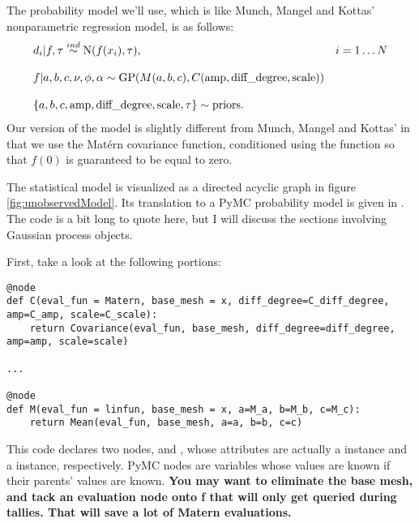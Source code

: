 \documentclass{manual}
\begin{document}
The probability model we'll use, which is like Munch, Mangel and Kottas' nonparametric regression model, is as follows:
\begin{equation}
	\label{eqn:npregression}
	\begin{array}{ll}
		d_i|f,\tau\stackrel{{\tiny ind}}{\sim} \textup N(f(x_i), \tau),&i=1\ldots N\\\\
		f|a,b,c,\nu,\phi,\alpha\sim\textup{GP}(M(a,b,c),C(\textup{amp} ,\textup{diff\_degree} ,\textup{scale}))&\\\\
		\{a,b,c,\textup{amp} ,\textup{diff\_degree} ,\textup{scale},\tau\} \sim \textup{priors}.
	\end{array}
\end{equation}
Our version of the model is slightly different from Munch, Mangel and Kottas' in that we use the Mat\'ern covariance function, conditioned using the  function so that $f(0)$ is guaranteed to be equal to zero.

The statistical model is visualized as a directed acyclic graph in figure \ref{fig:unobservedModel}. Its translation to a PyMC probability model is given in . The code is a bit long to quote here, but I will discuss the sections involving Gaussian process objects. 

First, take a look at the following portions:
\begin{verbatim}
@node
def C(eval_fun = Matern, base_mesh = x, diff_degree=C_diff_degree, amp=C_amp, scale=C_scale):
    return Covariance(eval_fun, base_mesh, diff_degree=diff_degree, amp=amp, scale=scale)

...

@node
def M(eval_fun = linfun, base_mesh = x, a=M_a, b=M_b, c=M_c):
    return Mean(eval_fun, base_mesh, a=a, b=b, c=c)

\end{verbatim}
This code declares two nodes,  and , whose  attributes are actually a  instance and a  instance, respectively. PyMC nodes are variables whose values are known if their parents' values are known.
\textbf{You may want to eliminate the base mesh, and tack an evaluation node onto f that will only get queried during tallies. That will save a lot of Matern evaluations.}
\end{document}
